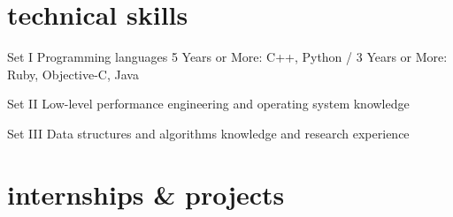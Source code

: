 \documentclass[__VERSION__]{friggeri-cv} %
\begin{document}

\section{technical skills}

\begin{entrylist}
  \entry
  {Set I}
  {Programming languages}
  {}
  {5 Years or More: C++, Python / 3 Years or More: Ruby, Objective-C, Java}

  \sentry
  {Set II}
  {Low-level performance engineering and operating system knowledge}
  {}

  \sentry
  {Set III}
  {Data structures and algorithms knowledge and research experience}
  {}
\end{entrylist}


\section{internships \& projects}
\end{document}
